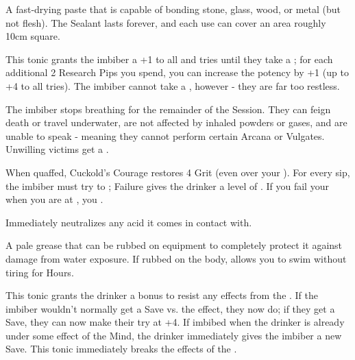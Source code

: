   A fast-drying paste that is capable of bonding stone, glass, wood, or metal (but not flesh). The Sealant lasts forever, and each use can cover an area roughly 10cm square.


\CHYMISTRY[
    Name=Chyme's Nerve Tonic,
    Link=chymistry-chymes-nerve-tonic,
    Type=Tonic,
    Pips=2+,
    Time=Days
]

This tonic grants the imbiber a +1 to all \RO and \RB tries until they take a ; for each additional 2 Research Pips you spend, you can increase the potency by +1 (up to +4 to all tries).  The imbiber cannot take a , however - they are far too restless.

  \CHYMISTRY[
    Name=Cold and Drowsy Humor,
    Link=chymistry-cold-drowsy-humor,
    Type=Powder,
    Pips=5,
    Time=Days
  ]

  The imbiber stops breathing for the remainder of the Session.  They can feign death or travel underwater, are not affected by inhaled powders or gases, and are unable to speak - meaning they cannot perform certain Arcana or Vulgates.  Unwilling victims get a .

\CHYMISTRY[
  Name=Cuckold's Courage,
  Link=chymistry-cuckold-courage,
  Type=Tonic,
  Pips=2,
  Time=Days
]

When quaffed, Cuckold's Courage restores 4 Grit (even over your \MAX). For every sip, the imbiber must try to \RSTRY{\VIG}; Failure gives the drinker a level of . If you fail your \RSTRY{\VIG} when you are at , you .


  \CHYMISTRY[
    Name=Dastin's Basic Talc,
    Link=chymistry-dastins-basic-talc,
    Type=Powder,
    Pips=5,
    Time=Days
  ]


  Immediately neutralizes any acid it comes in contact with. 


  \CHYMISTRY[
    Name=Faivre's Aqua Grease,
    Link=chymistry-faivres-aqua-grease,
    Type=Unguent,
    Pips=2,
    Time=Days
  ]

  A pale grease that can be rubbed on equipment to completely protect it against damage from water exposure. If rubbed on the body, allows you to swim without tiring for Hours.


\CHYMISTRY[
  Name=Fulcanelli's Clarifying Elixir,
  Link=chymistry-fulcanelli-clarifying-elixir,
  Type=Tonic,
  Pips=5,
  Time=Weeks
]

This tonic grants the drinker a bonus to resist any effects from the . If the imbiber wouldn't normally get a Save vs. the effect, they now do; if they  get a Save, they can now make their try at +4.  If imbibed when the drinker is already under some effect of the Mind, the drinker immediately gives the imbiber a new Save.  This tonic immediately breaks the effects of the .




